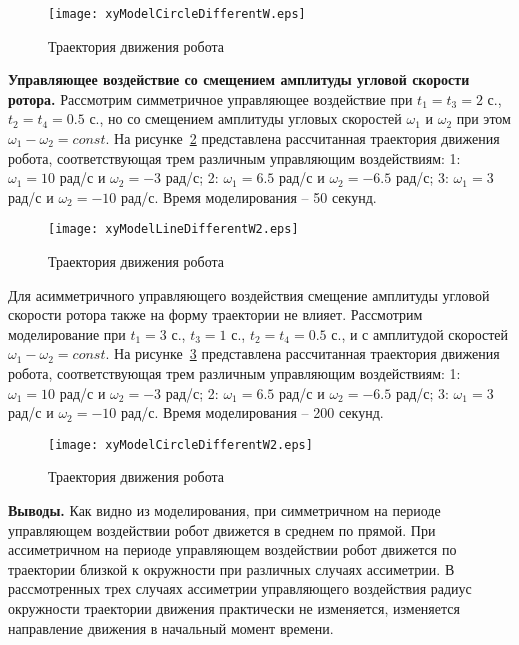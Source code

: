 \begin{figure}[!ht]
	\centering
	\texttt{[image: xyModelCircleDifferentW.eps]}
	\caption{Траектория движения робота }
	\label{xyModelCircleDifferentW}
\end{figure}

\textbf{Управляющее воздействие со смещением амплитуды угловой скорости ротора.} Рассмотрим симметричное управляющее воздействие при $t_1=t_3=2$ с., $t_2=t_4 = 0.5$ с., но со смещением амплитуды угловых скоростей $\omega_1$ и $\omega_2$ при этом $\omega_1 - \omega_2 = const$.  На рисунке~\ref{xyModelLineDifferentW2} представлена рассчитанная траектория движения робота, соответствующая трем различным управляющим воздействиям: 1: $\omega_1=10$ рад/с и $\omega_2=-3$ рад/с; 2: $\omega_1=6.5$ рад/с и $\omega_2=-6.5$ рад/с; 3: $\omega_1=3$ рад/с и $\omega_2=-10$ рад/с. Время моделирования -- 50 секунд.

\begin{figure}[!ht]
	\centering
	\texttt{[image: xyModelLineDifferentW2.eps]}
	\caption{Траектория движения робота}
	\label{xyModelLineDifferentW2}
\end{figure}

Для асимметричного управляющего воздействия смещение амплитуды угловой скорости ротора также на форму траектории не влияет. Рассмотрим моделирование при $t_1=3$ с., $t_3=1$ с., $t_2=t_4 = 0.5$ с., и с амплитудой скоростей $\omega_1 - \omega_2 = const$. На рисунке~\ref{xyModelCircleDifferentW2} представлена рассчитанная траектория движения робота, соответствующая трем различным управляющим воздействиям: 1: $\omega_1=10$ рад/с и $\omega_2=-3$ рад/с; 2: $\omega_1=6.5$ рад/с и $\omega_2=-6.5$ рад/с; 3: $\omega_1=3$ рад/с и $\omega_2=-10$ рад/с. Время моделирования -- 200 секунд.

\begin{figure}[!ht]
	\centering
	\texttt{[image: xyModelCircleDifferentW2.eps]}
	\caption{Траектория движения робота}
	\label{xyModelCircleDifferentW2}
\end{figure}

\textbf{Выводы.} Как видно из моделирования, при симметричном на периоде управляющем воздействии робот движется в среднем по прямой. При ассиметричном на периоде управляющем воздействии робот движется по траектории близкой к окружности при различных случаях ассиметрии. В рассмотренных трех случаях ассиметрии управляющего воздействия радиус окружности траектории движения практически не изменяется, изменяется направление движения в начальный момент времени.

